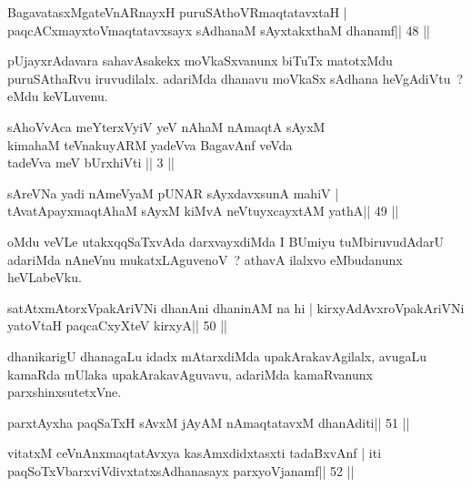 \begin{shl}
BagavatasxMgateVnARnayxH puruSAthoVR\s maqtatavxtaH |
paqcACxmayxtoV\s maqtatavxsayx sAdhanaM sAyxtakxthaM dhanamf\hfill || 48 ||
\end{shl}

\begin{artha}
pUjayxrAdavara sahavAsakekx moVkaSxvanunx biTuTx matotxMdu puruSAthaRvu iruvudilalx. adariMda dhanavu moVkaSx sAdhana heVgAdiVtu~? eMdu keVLuvenu.
\end{artha}


\begin{kandikeshl}
sAhoVvAca meYterxVyiV yeV nAhaM nAmaqtA sAyxM\\
kimahaM teVnakuyARM yadeVva BagavAnf veVda\\
tadeVva meV bUrxhiVti || 3 ||
\end{kandikeshl}

\begin{shl}
sAreVNa yadi nAmeVyaM pUNAR sAyxdavxsunA mahiV |
tAvatA\s payxmaqtA\s haM sAyxM kiMvA neVtuyxcayxtAM yathA\hfill || 49 ||
\end{shl}

\begin{artha}
oMdu veVLe utakxqqSaTxvAda darxvayxdiMda I BUmiyu tuMbiruvudAdarU adariMda nAneVnu mukatxLAguvenoV~? athavA ilalxvo eMbudanunx heVLabeVku.
\end{artha}

\begin{shl}
satAtxmAtorxVpakAriVNi dhanAni dhaninAM na hi |
kirxyAdAvxroVpakAriVNi yatoV\s taH paqcaCxyXteV kirxyA\hfill || 50 ||
\end{shl}

\begin{artha}
dhanikarigU dhanagaLu idadx mAtarxdiMda upakArakavAgilalx, avugaLu
kamaRda mUlaka upakArakavAguvavu, adariMda kamaRvanunx
parxshinxsutetxVne.
\end{artha}


\begin{shl}
parxtAyxha paqSaTxH sAvxM jAyAM nAmaqtatavxM dhanAditi\hfill || 51 ||
\end{shl}

\begin{shl}
vitatxM ceVnAnxmaqtatAvxya kasAmxdidxtasxti tadaBxvAnf |
iti paqSoTxV\s barxviVdivxtatxsAdhanasayx parxyoVjanamf\hfill || 52 ||
\end{shl}

